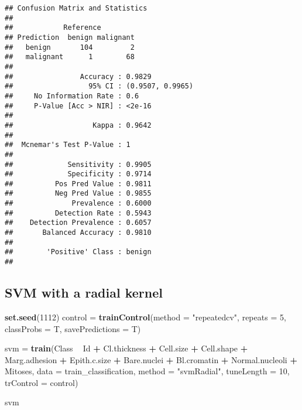 \documentclass[]{article}
\newenvironment{Shaded}{\begin{snugshade}}{\end{snugshade}}
\newcommand{\DataTypeTok}[1]{\textcolor[rgb]{0.13,0.29,0.53}{#1}}
\newcommand{\DecValTok}[1]{\textcolor[rgb]{0.00,0.00,0.81}{#1}}
\newcommand{\KeywordTok}[1]{\textcolor[rgb]{0.13,0.29,0.53}{\textbf{#1}}}
\newcommand{\NormalTok}[1]{#1}
\newcommand{\OperatorTok}[1]{\textcolor[rgb]{0.81,0.36,0.00}{\textbf{#1}}}
\newcommand{\StringTok}[1]{\textcolor[rgb]{0.31,0.60,0.02}{#1}}
\begin{document}
\begin{verbatim}
## Confusion Matrix and Statistics
## 
##            Reference
## Prediction  benign malignant
##   benign       104         2
##   malignant      1        68
##                                           
##                Accuracy : 0.9829          
##                  95% CI : (0.9507, 0.9965)
##     No Information Rate : 0.6             
##     P-Value [Acc > NIR] : <2e-16          
##                                           
##                   Kappa : 0.9642          
##                                           
##  Mcnemar's Test P-Value : 1               
##                                           
##             Sensitivity : 0.9905          
##             Specificity : 0.9714          
##          Pos Pred Value : 0.9811          
##          Neg Pred Value : 0.9855          
##              Prevalence : 0.6000          
##          Detection Rate : 0.5943          
##    Detection Prevalence : 0.6057          
##       Balanced Accuracy : 0.9810          
##                                           
##        'Positive' Class : benign          
## 
\end{verbatim}

\hypertarget{svm-with-a-radial-kernel}{%
\subsection{SVM with a radial kernel}\label{svm-with-a-radial-kernel}}

\begin{Shaded}
\begin{Highlighting}[]
\KeywordTok{set.seed}\NormalTok{(}\DecValTok{1112}\NormalTok{)}
\NormalTok{control =}\StringTok{ }\KeywordTok{trainControl}\NormalTok{(}\DataTypeTok{method =} \StringTok{"repeatedcv"}\NormalTok{, }\DataTypeTok{repeats =} \DecValTok{5}\NormalTok{, }\DataTypeTok{classProbs =}\NormalTok{ T, }\DataTypeTok{savePredictions =}\NormalTok{ T)}

\NormalTok{svm =}\StringTok{ }\KeywordTok{train}\NormalTok{(Class }\OperatorTok{~}\StringTok{ }\NormalTok{Id }\OperatorTok{+}\StringTok{ }\NormalTok{Cl.thickness }\OperatorTok{+}\StringTok{ }\NormalTok{Cell.size }\OperatorTok{+}\StringTok{ }\NormalTok{Cell.shape }\OperatorTok{+}\StringTok{ }\NormalTok{Marg.adhesion }\OperatorTok{+}\StringTok{ }\NormalTok{Epith.c.size }\OperatorTok{+}\StringTok{ }\NormalTok{Bare.nuclei }\OperatorTok{+}\StringTok{ }\NormalTok{Bl.cromatin }\OperatorTok{+}\StringTok{ }\NormalTok{Normal.nucleoli }\OperatorTok{+}\StringTok{  }\NormalTok{Mitoses,  }\DataTypeTok{data =}\NormalTok{ train_classification, }\DataTypeTok{method =} \StringTok{"svmRadial"}\NormalTok{, }\DataTypeTok{tuneLength =} \DecValTok{10}\NormalTok{, }\DataTypeTok{trControl =}\NormalTok{ control)}

\NormalTok{svm}
\end{Highlighting}
\end{Shaded}
\end{document}
